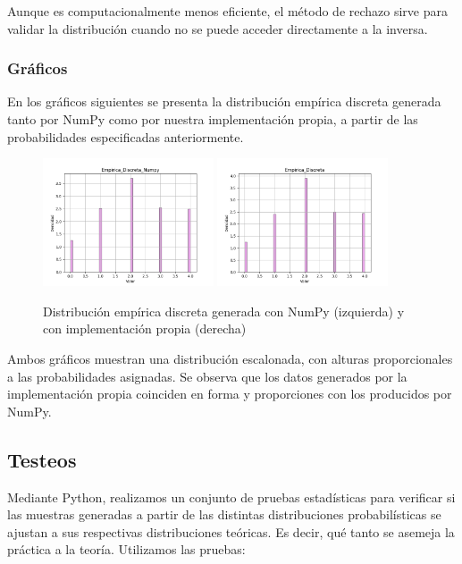 \documentclass{article}
\begin{document}
Aunque es computacionalmente menos eficiente, el método de rechazo sirve para validar la distribución cuando no se puede acceder directamente a la inversa.

\subsubsection{Gráficos}
En los gráficos siguientes se presenta la distribución empírica discreta generada tanto por NumPy como por nuestra implementación propia, a partir de las probabilidades especificadas anteriormente.

\begin{figure}[H]
    \centering
    \includegraphics[width=0.45\textwidth]{Imagenes/Distribucion_Empirica_Discreta_Numpy.png}
    \includegraphics[width=0.45\textwidth]{Imagenes/Distribucion_Empirica_Discreta.png}
    \caption{Distribución empírica discreta generada con NumPy (izquierda) y con implementación propia (derecha)}
    \label{fig:empirica_discreta}
\end{figure}

Ambos gráficos muestran una distribución escalonada, con alturas proporcionales a las probabilidades asignadas. Se observa que los datos generados por la implementación propia coinciden en forma y proporciones con los producidos por NumPy.


\subsection{Testeos}
Mediante Python, realizamos un  conjunto de pruebas estadísticas para verificar si las muestras generadas a partir de las distintas distribuciones probabilísticas se ajustan a sus respectivas distribuciones teóricas. Es decir, qué tanto se asemeja la práctica a la teoría. Utilizamos las pruebas:
\end{document}
